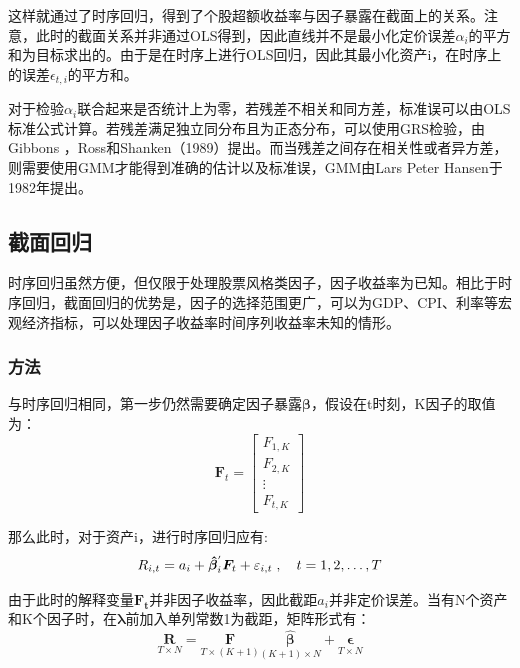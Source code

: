 \documentclass[11pt]{article}
\begin{document}
这样就通过了时序回归，得到了个股超额收益率与因子暴露在截面上的关系。注意，此时的截面关系并非通过OLS得到，因此直线并不是最小化定价误差$\alpha_i$的平方和为目标求出的。由于是在时序上进行OLS回归，因此其最小化资产i，在时序上的误差$\epsilon_{t,i}$的平方和。

对于检验$\alpha_i$联合起来是否统计上为零，若残差不相关和同方差，标准误可以由OLS标准公式计算。若残差满足独立同分布且为正态分布，可以使用GRS检验，由Gibbons
，Ross和Shanken（1989）提出。而当残差之间存在相关性或者异方差，则需要使用GMM才能得到准确的估计以及标准误，GMM由Lars Peter Hansen于1982年提出。

\subsection{截面回归}

时序回归虽然方便，但仅限于处理股票风格类因子，因子收益率为已知。相比于时序回归，截面回归的优势是，因子的选择范围更广，可以为GDP、CPI、利率等宏观经济指标，可以处理因子收益率时间序列收益率未知的情形。

\subsubsection{方法}

与时序回归相同，第一步仍然需要确定因子暴露$\bm{\beta}$，假设在t时刻，K因子的取值为：
\begin{equation*}
    \bm{F}_t =
    \begin{bmatrix}
        F_{1,K} \\
        F_{2,K} \\
        \vdots \\
        F_{t,K} 
    \end{bmatrix}
\end{equation*}

那么此时，对于资产i，进行时序回归应有:
\begin{equation*}
    R_{i,t} = a_i + \bm{\hat{\beta}}_{i}^{'} \bm{F}_t + \varepsilon_{i,t} \;,\quad t=1,2,\dots,T
\end{equation*}

由于此时的解释变量$\bm{F_t}$并非因子收益率，因此截距$a_i$并非定价误差。当有N个资产和K个因子时，在$\bm{\lambda}$前加入单列常数1为截距，矩阵形式有：
\begin{equation*}
    \underset{T \times N}{\bm{R}} = \underset{ T \times (K+1)}{\bm{F}} \underset{(K+1) \times N}{\hat{\bm{\beta}}} + \underset{T \times N}{\bm{\epsilon}}
\end{equation*}
\end{document}
